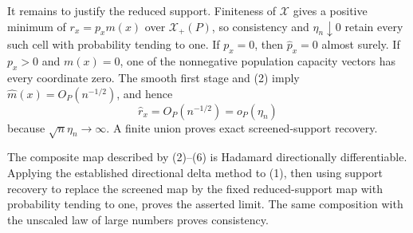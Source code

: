 It remains to justify the reduced support.  Finiteness of \(\mathcal X\) gives a positive minimum of \(r_x=p_xm(x)\) over \(\mathcal X_+(P)\), so consistency and \(\eta_n\downarrow0\) retain every such cell with probability tending to one.  If \(p_x=0\), then \(\widehat p_x=0\) almost surely.  If \(p_x>0\) and \(m(x)=0\), one of the nonnegative population capacity vectors has every coordinate zero.  The smooth first stage and (2) imply \(\widehat m(x)=O_P(n^{-1/2})\), and hence
\[
\widehat r_x=O_P(n^{-1/2})=o_P(\eta_n)
\]
because \(\sqrt n\eta_n\to\infty\).  A finite union proves exact screened-support recovery.

The composite map described by (2)--(6) is Hadamard directionally differentiable.  Applying the established directional delta method to (1), then using support recovery to replace the screened map by the fixed reduced-support map with probability tending to one, proves the asserted limit.  The same composition with the unscaled law of large numbers proves consistency.
